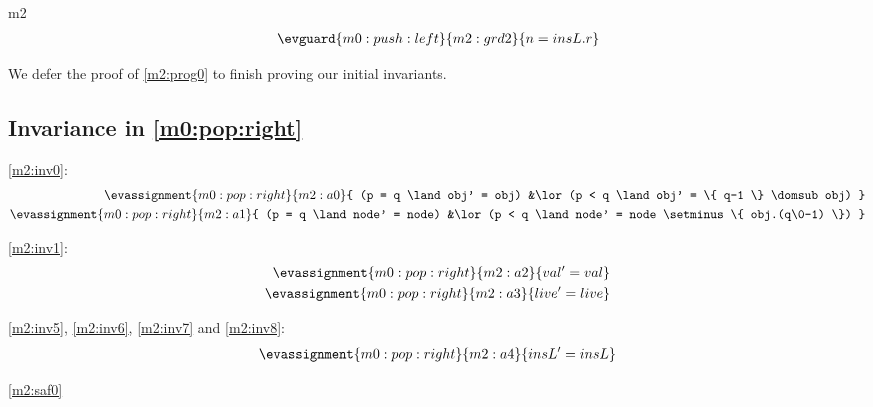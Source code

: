 \documentclass[12pt]{amsart}
\begin{document}
\begin{machine}{m2}
\begin{align*}
	\evguard{m0:push:left}{m2:grd2}{ n = insL.r }
\end{align*}

We defer the proof of \ref{m2:prog0} to finish proving our initial invariants.

\subsection{Invariance in \ref{m0:pop:right}}


\ref{m2:inv0}:
\begin{align*}
\evassignment{m0:pop:right}{m2:a0}
	{ 	  (p = q \land obj' = obj)
	&\lor (p < q \land obj' = \{ q-1 \} \domsub obj) }
\\ \evassignment{m0:pop:right}{m2:a1}
	{ 	 (p = q \land node' = node)
	&\lor (p < q \land node' = node \setminus \{ obj.(q\0-1) \}) }
\end{align*}

\ref{m2:inv1}:
\begin{align*}
\evassignment{m0:pop:right}{m2:a2}{ val' = val }
\\ \evassignment{m0:pop:right}{m2:a3}{ live' = live }
\end{align*}

\ref{m2:inv5}, \ref{m2:inv6}, \ref{m2:inv7} and \ref{m2:inv8}:
\begin{align*}
\evassignment{m0:pop:right}{m2:a4}{ insL' = insL }
\end{align*}

\ref{m2:saf0}
\begin{align*}
\end{align*}


\end{machine}
\end{document}
